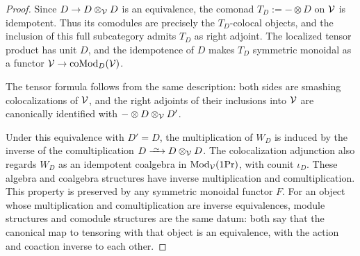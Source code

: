 \documentclass[11pt]{book}
\begin{document}
	\begin{proof}
		Since $D \to D \otimes_{\mathcal{V}} D$ is an equivalence, the comonad $T_D := -\otimes D$ on $\mathcal{V}$ is idempotent. Thus its comodules are precisely the $T_D$-colocal objects, and the inclusion of this full subcategory admits $T_D$ as right adjoint. The localized tensor product has unit $D$, and the idempotence of $D$ makes $T_D$ symmetric monoidal as a functor $\mathcal{V} \to {\textup{coMod}}_D(\mathcal{V})$.

		The tensor formula follows from the same description: both sides are smashing colocalizations of $\mathcal{V}$, and the right adjoints of their inclusions into $\mathcal{V}$ are canonically identified with $-\otimes D \otimes_{\mathcal{V}} D'$.

		Under this equivalence with $D'=D$, the multiplication of $W_D$ is induced by the inverse of the comultiplication $D \iso D \otimes_\Vv D$. The colocalization adjunction also regards $W_D$ as an idempotent coalgebra in ${\textup{Mod}}_{\mathcal{V}}(1\textup{Pr})$, with counit $\iota_D$. These algebra and coalgebra structures have inverse multiplication and comultiplication. This property is preserved by any symmetric monoidal functor $F$. For an object whose multiplication and comultiplication are inverse equivalences, module structures and comodule structures are the same datum: both say that the canonical map to tensoring with that object is an equivalence, with the action and coaction inverse to each other.
	\end{proof}
\end{document}
